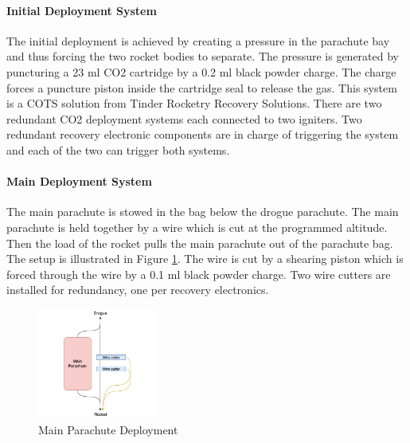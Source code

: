 \paragraph{Initial Deployment System}
\hfill \break
The initial deployment is achieved by creating a pressure in the parachute bay and thus forcing the two rocket bodies to separate. The pressure is generated by puncturing a 23 ml CO2 cartridge by a 0.2 ml black powder charge. The charge forces a puncture piston inside the cartridge seal to release the gas. This system is a COTS solution from Tinder Rocketry Recovery Solutions.
There are two redundant CO2 deployment systems each connected to two igniters. Two redundant recovery electronic components are in charge of triggering the system and each of the two can trigger both systems.

\paragraph{Main Deployment System}
\hfill \break
The main parachute is stowed in the bag below the drogue parachute. The main parachute is held together by a wire which is cut at the programmed altitude. Then the load of the rocket pulls the main parachute out of the parachute bag. The setup is illustrated in Figure \ref{f:recovery_main_deployment}. The wire is cut by a shearing piston which is forced through the wire by a 0.1 ml black powder charge. Two wire cutters are installed for redundancy, one per recovery electronics.
\begin{figure}[h!]
 	\centering
        \includegraphics[width=0.35\textwidth]{img/recovery_main_deployment.jpg}
        \caption{Main Parachute Deployment}
        \label{f:recovery_main_deployment}
 \end{figure}
